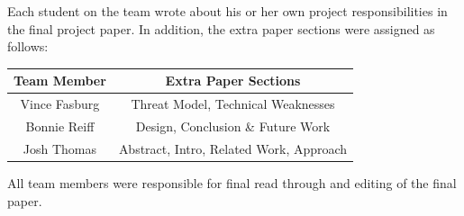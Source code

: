 \documentclass[pagenumbers]{ieee}
\begin{document}
Each student on the team wrote about his or her own project responsibilities in the final project paper. In addition, the extra paper sections were assigned as follows:

\begin{center}
	\begin{tabular}{ | c | c | }
		\hline \textbf{Team Member} & \textbf{Extra Paper Sections} \\ \hline
		Vince Fasburg & Threat Model, Technical Weaknesses \\ \hline
		Bonnie Reiff &  Design, Conclusion \& Future Work \\ \hline
		Josh Thomas & Abstract, Intro, Related Work, Approach  \\ \hline
	\end{tabular}
\end{center}

 All team members were responsible for final read through and editing of the final paper.




\end{document}
